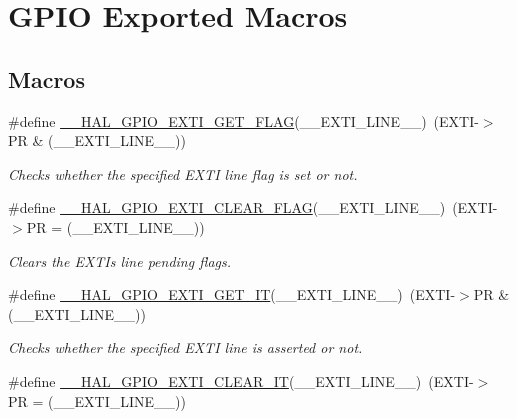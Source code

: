 \hypertarget{group___g_p_i_o___exported___macros}{}\section{G\+P\+IO Exported Macros}
\label{group___g_p_i_o___exported___macros}
\subsection*{Macros}
\begin{DoxyCompactItemize}
\item 
\#define \hyperlink{group___g_p_i_o___exported___macros_gaae18fc8d92ffa4df2172c78869e712fc}{\+\_\+\+\_\+\+H\+A\+L\+\_\+\+G\+P\+I\+O\+\_\+\+E\+X\+T\+I\+\_\+\+G\+E\+T\+\_\+\+F\+L\+AG}(\+\_\+\+\_\+\+E\+X\+T\+I\+\_\+\+L\+I\+N\+E\+\_\+\+\_\+)~(E\+X\+TI-\/$>$PR \& (\+\_\+\+\_\+\+E\+X\+T\+I\+\_\+\+L\+I\+N\+E\+\_\+\+\_\+))
\begin{DoxyCompactList}\small\item\em Checks whether the specified E\+X\+TI line flag is set or not. \end{DoxyCompactList}\item 
\#define \hyperlink{group___g_p_i_o___exported___macros_ga2f28fc349d1812cdc55a77c68d2b278d}{\+\_\+\+\_\+\+H\+A\+L\+\_\+\+G\+P\+I\+O\+\_\+\+E\+X\+T\+I\+\_\+\+C\+L\+E\+A\+R\+\_\+\+F\+L\+AG}(\+\_\+\+\_\+\+E\+X\+T\+I\+\_\+\+L\+I\+N\+E\+\_\+\+\_\+)~(E\+X\+TI-\/$>$PR = (\+\_\+\+\_\+\+E\+X\+T\+I\+\_\+\+L\+I\+N\+E\+\_\+\+\_\+))
\begin{DoxyCompactList}\small\item\em Clears the E\+X\+TI\textquotesingle{}s line pending flags. \end{DoxyCompactList}\item 
\#define \hyperlink{group___g_p_i_o___exported___macros_ga27f0e1f6c38745169d74620f6a178a94}{\+\_\+\+\_\+\+H\+A\+L\+\_\+\+G\+P\+I\+O\+\_\+\+E\+X\+T\+I\+\_\+\+G\+E\+T\+\_\+\+IT}(\+\_\+\+\_\+\+E\+X\+T\+I\+\_\+\+L\+I\+N\+E\+\_\+\+\_\+)~(E\+X\+TI-\/$>$PR \& (\+\_\+\+\_\+\+E\+X\+T\+I\+\_\+\+L\+I\+N\+E\+\_\+\+\_\+))
\begin{DoxyCompactList}\small\item\em Checks whether the specified E\+X\+TI line is asserted or not. \end{DoxyCompactList}\item 
\#define \hyperlink{group___g_p_i_o___exported___macros_ga2a086506eec826f49b200fba64beb9f1}{\+\_\+\+\_\+\+H\+A\+L\+\_\+\+G\+P\+I\+O\+\_\+\+E\+X\+T\+I\+\_\+\+C\+L\+E\+A\+R\+\_\+\+IT}(\+\_\+\+\_\+\+E\+X\+T\+I\+\_\+\+L\+I\+N\+E\+\_\+\+\_\+)~(E\+X\+TI-\/$>$PR = (\+\_\+\+\_\+\+E\+X\+T\+I\+\_\+\+L\+I\+N\+E\+\_\+\+\_\+))

\end{DoxyCompactItemize}
